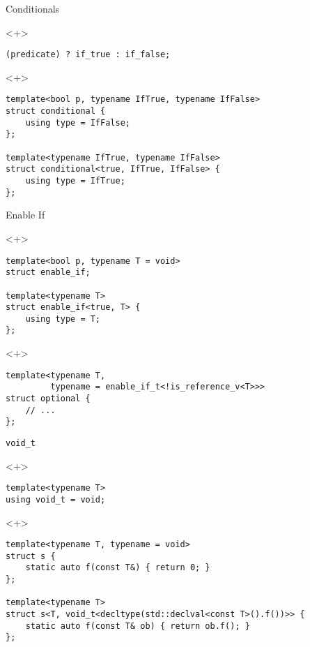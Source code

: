 \documentclass[table]{beamer}
\begin{document}
\begin{frame}[fragile]{Conditionals}
  \begin{onlyenv}<+>
    \begin{verbatim}
(predicate) ? if_true : if_false;
    \end{verbatim}
  \end{onlyenv}

  \begin{onlyenv}<+>
    \begin{verbatim}
template<bool p, typename IfTrue, typename IfFalse>
struct conditional {
    using type = IfFalse;
};

template<typename IfTrue, typename IfFalse>
struct conditional<true, IfTrue, IfFalse> {
    using type = IfTrue;
};
    \end{verbatim}
  \end{onlyenv}
\end{frame}

\begin{frame}[fragile]{Enable If}
  \begin{onlyenv}<+>
    \begin{verbatim}
template<bool p, typename T = void>
struct enable_if;

template<typename T>
struct enable_if<true, T> {
    using type = T;
};
    \end{verbatim}
  \end{onlyenv}

  \begin{onlyenv}<+>
    \begin{verbatim}
template<typename T,
         typename = enable_if_t<!is_reference_v<T>>>
struct optional {
    // ...
};
    \end{verbatim}
  \end{onlyenv}
\end{frame}

\begin{frame}[fragile]{\texttt{void\_t}}
  \begin{onlyenv}<+>
    \begin{verbatim}
template<typename T>
using void_t = void;
    \end{verbatim}
  \end{onlyenv}

  \begin{onlyenv}<+>
    \begin{verbatim}
template<typename T, typename = void>
struct s {
    static auto f(const T&) { return 0; }
};

template<typename T>
struct s<T, void_t<decltype(std::declval<const T>().f())>> {
    static auto f(const T& ob) { return ob.f(); }
};
    \end{verbatim}  
  \end{onlyenv}
\end{frame}
\end{document}
